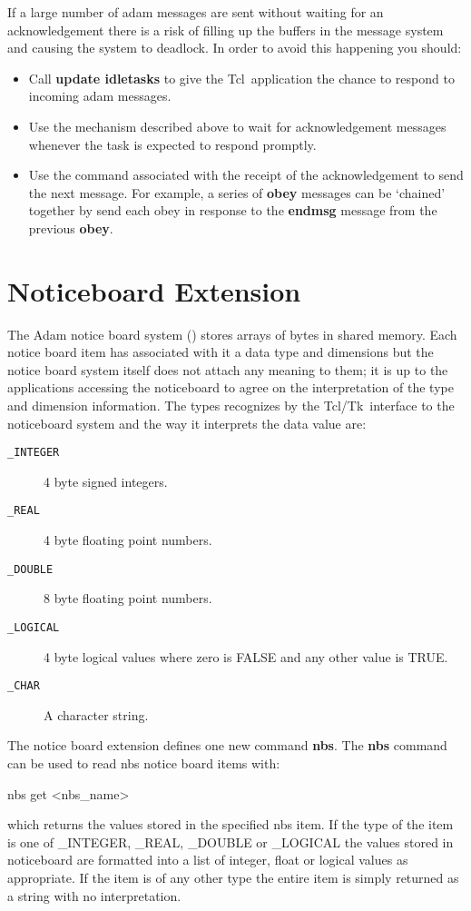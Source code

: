 \documentclass[twoside,11pt,nolof]{starlink}
\providecommand{\Tcl}{{\textsf{Tcl}}}
\providecommand{\TclTk}{{\textsf{Tcl/Tk}}}
\begin{document}
If a large number of adam messages are sent without waiting for an
acknowledgement there is a risk of filling up the buffers in the message
system and causing the system to deadlock. In order to avoid this
happening you should:
\begin{itemize}
\item Call \textbf{update idletasks} to give the \Tcl\ application the chance
to respond to incoming adam messages.
\item Use the mechanism described above to wait for acknowledgement
messages whenever the task is expected to respond promptly.
\item Use the command associated with the receipt of the acknowledgement to
send the next message. For example, a series of \textbf{obey} messages can
be `chained'
together by send each obey in response to the \textbf{endmsg} message from the
previous \textbf{obey}.
\end{itemize}

\section{\label{noticeboard_extension}Noticeboard Extension}

The Adam notice board system () stores arrays of
bytes in shared memory.
Each notice board item has associated with it a data type and dimensions but
the notice board system itself does not attach any meaning to them; it is
up to the applications accessing the noticeboard to agree on the interpretation
of the type and dimension information. The types recognizes by the \TclTk\
interface to the noticeboard system and the way it interprets the data
value are:

\begin{description}
\item[\texttt{\_INTEGER}] 4 byte signed integers.
\item[\texttt{\_REAL}] 4 byte floating point numbers.
\item[\texttt{\_DOUBLE}] 8 byte floating point numbers.
\item[\texttt{\_LOGICAL}] 4 byte logical values where zero is FALSE and any
other value is TRUE.
\item[\texttt{\_CHAR}] A character string.
\end{description}

The notice board extension defines one new command \textbf{nbs}.
The \textbf{nbs} command can be used to read nbs notice board items with:
\begin{terminalv}
nbs get <nbs_name>
\end{terminalv}
which returns the values stored in the specified nbs item. If the type of the
item is one of \_INTEGER, \_REAL, \_DOUBLE or \_LOGICAL the values stored in
noticeboard are formatted into a list of integer, float or logical values as
appropriate. If the item is of any other type the entire item is simply
returned as a string with no interpretation.
\end{document}
